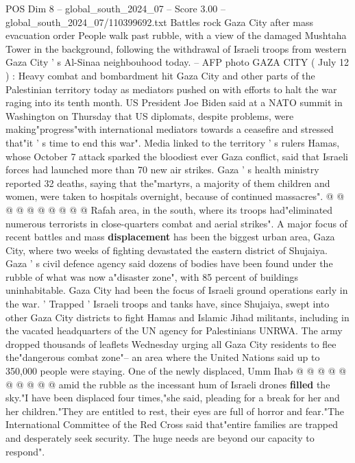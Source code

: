 \begin{textsample}{POS Dim 8 – global\_south\_2024\_07 – Score 3.00 – global\_south\_2024\_07/110399692.txt}  \label{ex:f8_pos_337}
Battles rock Gaza City after mass evacuation order People walk past rubble, with a view of the damaged Mushtaha Tower in the background, following the withdrawal of Israeli troops from western Gaza City ' s Al-Sinaa neighbouhood today. -- AFP photo GAZA CITY ( July 12 ) : Heavy combat and bombardment hit Gaza City and other parts of the Palestinian territory today as mediators pushed on with efforts to halt the war raging into its tenth month.
US President Joe Biden said at a NATO summit in Washington on Thursday that US diplomats, despite problems, were making"progress"with international mediators towards a ceasefire and stressed that"it ' s time to end this war".
Media linked to the territory ' s rulers Hamas, whose October 7 attack sparked the bloodiest ever Gaza conflict, said that Israeli forces had launched more than 70 new air strikes.
Gaza ' s health ministry reported 32 deaths, saying that the"martyrs, a majority of them children and women, were taken to hospitals overnight, because of continued massacres". @ @ @ @ @ @ @ @ @ @ Rafah area, in the south, where its troops had"eliminated numerous terrorists in close-quarters combat and aerial strikes".
A major focus of recent battles and mass \textbf{displacement} has been the biggest urban area, Gaza City, where two weeks of fighting devastated the eastern district of Shujaiya.
Gaza ' s civil defence agency said dozens of bodies have been found under the rubble of what was now a"disaster zone", with 85 percent of buildings uninhabitable.
Gaza City had been the focus of Israeli ground operations early in the war. ' Trapped ' Israeli troops and tanks have, since Shujaiya, swept into other Gaza City districts to fight Hamas and Islamic Jihad militants, including in the vacated headquarters of the UN agency for Palestinians UNRWA.
The army dropped thousands of leaflets Wednesday urging all Gaza City residents to flee the"dangerous combat zone"-- an area where the United Nations said up to 350,000 people were staying.
One of the newly displaced, Umm Ihab @ @ @ @ @ @ @ @ @ @ amid the rubble as the incessant hum of Israeli drones \textbf{filled} the sky."I have been displaced four times,"she said, pleading for a break for her and her children."They are entitled to rest, their eyes are full of horror and fear."The International Committee of the Red Cross said that"entire families are trapped and desperately seek security.
The huge needs are beyond our capacity to respond".

\end{textsample}
